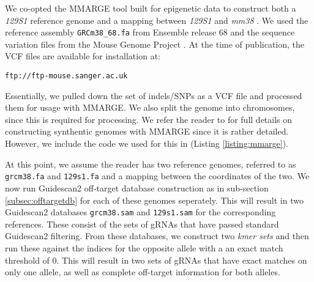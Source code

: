 \documentclass[11pt]{article}
\begin{document}
We co-opted the MMARGE tool built for epigenetic data to construct
both a \textit{129S1} reference genome and a mapping between
\textit{129S1} and \textit{mm38} \parencite{link2018mmarge}. We used
the reference assembly \texttt{GRCm38\_68.fa} from Ensemble release 68
and the sequence variation files from the Mouse Genome Project
\parencite{keane2011mouse}. At the time of publication, the VCF files
are available for installation at:

\begin{center}
  \texttt{ftp://ftp-mouse.sanger.ac.uk}
\end{center}

Essentially, we pulled down the set of indels/SNPs as a VCF file and
processed them for usage with MMARGE. We also split the genome into
chromosomes, since this is required for processing. We refer the
reader to \parencite{link2018mmarge} for full details on constructing
synthentic genomes with MMARGE since it is rather detailed. However,
we include the code we used for this in (Listing
\ref{listing:mmarge}).

At this point, we assume the reader has two reference genomes,
referred to as \texttt{grcm38.fa} and \texttt{129s1.fa} and a mapping
between the coordinates of the two. We now run Guidescan2 off-target
database construction as in sub-section \ref{subsec:offtargetdb} for
each of these genomes seperately. This will result in two Guidescan2
databases \texttt{grcm38.sam} and \texttt{129s1.sam} for the
corresponding references. These consist of the sets of gRNAs that have
passed standard Guidescan2 filtering. From these databases, we
construct two {\it kmer sets} and then run these against the indices
for the opposite allele with a an exact match threshold of 0. This
will result in two sets of gRNAs that have exact matches on only one
allele, as well as complete off-target information for both alleles.

\end{document}
